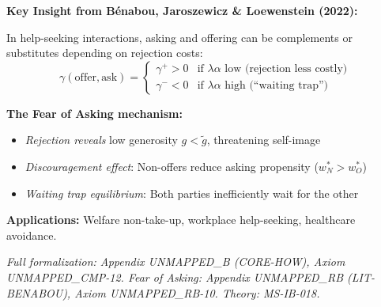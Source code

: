 \begin{tcolorbox}[
    colback=blue!5!white,
    colframe=blue!60!black,
    title={\textbf{Advanced: Asking-Offering Complementarity (Axiom UNMAPPED_CMP-12)}},
    fonttitle=\bfseries
]
\textbf{Key Insight from Bénabou, Jaroszewicz \& Loewenstein (2022):}

In help-seeking interactions, asking and offering can be complements or substitutes depending on rejection costs:
\begin{equation}
\gamma(\text{offer}, \text{ask}) = \begin{cases}
\gamma^{+} > 0 & \text{if } \lambda\alpha \text{ low (rejection less costly)} \\
\gamma^{-} < 0 & \text{if } \lambda\alpha \text{ high (``waiting trap'')}
\end{cases}
\end{equation}

\textbf{The Fear of Asking mechanism:}
\begin{itemize}[nosep]
    \item \textit{Rejection reveals} low generosity $g < \tilde{g}$, threatening self-image
    \item \textit{Discouragement effect}: Non-offers reduce asking propensity ($w^*_N > w^*_O$)
    \item \textit{Waiting trap equilibrium}: Both parties inefficiently wait for the other
\end{itemize}

\textbf{Applications:} Welfare non-take-up, workplace help-seeking, healthcare avoidance.

\medskip
\textit{Full formalization: Appendix UNMAPPED_B (CORE-HOW), Axiom UNMAPPED_CMP-12. Fear of Asking: Appendix UNMAPPED_RB (LIT-BENABOU), Axiom UNMAPPED_RB-10. Theory: MS-IB-018.}
\end{tcolorbox}


